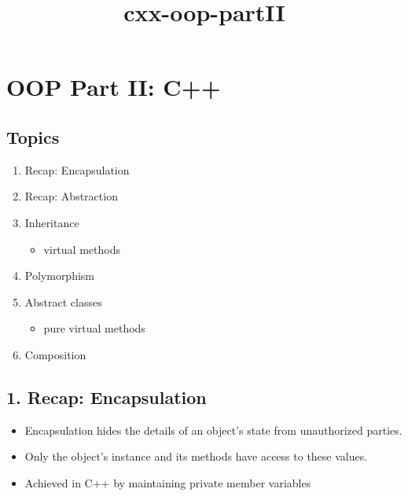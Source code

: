 \documentclass[11pt]{article}
\title{cxx-oop-partII}
\providecommand{\tightlist}{%
      \setlength{\itemsep}{0pt}\setlength{\parskip}{0pt}}
\begin{document}
    
    
    \maketitle
    
    

    
    \hypertarget{oop-part-ii-c}{%
\section{OOP Part II: C++}\label{oop-part-ii-c}}

\hypertarget{topics}{%
\subsection{Topics}\label{topics}}

\begin{enumerate}
\def\labelenumi{\arabic{enumi}.}
\tightlist
\item
  Recap: Encapsulation
\item
  Recap: Abstraction
\item
  Inheritance

  \begin{itemize}
  \tightlist
  \item
    virtual methods
  \end{itemize}
\item
  Polymorphism
\item
  Abstract classes

  \begin{itemize}
  \tightlist
  \item
    pure virtual methods
  \end{itemize}
\item
  Composition
\end{enumerate}

\hypertarget{recap-encapsulation}{%
\subsection{1. Recap: Encapsulation}\label{recap-encapsulation}}

\begin{itemize}
\tightlist
\item
  Encapsulation hides the details of an object's state from unauthorized
  parties.
\item
  Only the object's instance and its methods have access to these
  values.
\item
  Achieved in C++ by maintaining private member variables
\end{itemize}
\end{document}
